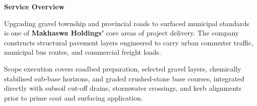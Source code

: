\documentclass[a4paper,11pt]{article}
\begin{document}
\noindent
\begin{minipage}[t]{0.63\textwidth}
    \vspace{0pt}
    {\large\bfseries\color{mhnavy} Service Overview}
    \vspace{0.08cm}

    {\fontsize{8.7pt}{12.3pt}\selectfont\color{mhtext}
    Upgrading gravel township and provincial roads to surfaced municipal standards is one of \textbf{Makhaswa Holdings'} core areas of project delivery. The company constructs structural pavement layers engineered to carry urban commuter traffic, municipal bus routes, and commercial freight loads.
    }

    \vspace{0.15cm}

    {\fontsize{8.7pt}{12.3pt}\selectfont\color{mhtext}
    Scope execution covers roadbed preparation, selected gravel layers, chemically stabilised sub-base horizons, and graded crushed-stone base courses, integrated directly with subsoil cut-off drains, stormwater crossings, and kerb alignments prior to prime coat and surfacing application.
    }
\end{minipage}
\hfill
\end{document}
